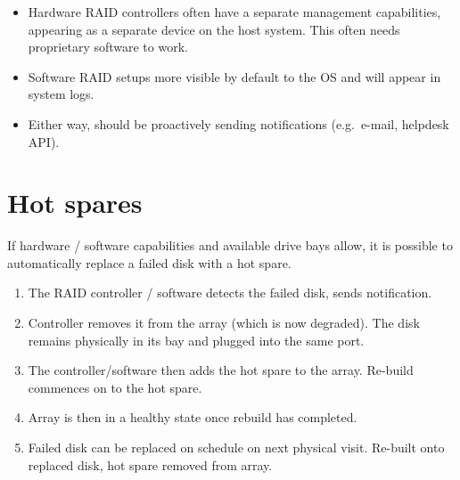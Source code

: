 \begin{itemize}
\item
  Hardware RAID controllers often have a separate management
  capabilities, appearing as a separate device on the host system. This
  often needs proprietary software to work.
\item
  Software RAID setups more visible by default to the OS and will appear
  in system logs.
\item
  Either way, should be proactively sending notifications (e.g.~e-mail,
  helpdesk API).
\end{itemize}

\section{Hot spares}\label{hot-spares}

If hardware / software capabilities and available drive bays allow, it
is possible to automatically replace a failed disk with a hot spare.

\begin{enumerate}
\def\labelenumi{\arabic{enumi}.}
\item
  The RAID controller / software detects the failed disk, sends
  notification.
\item
  Controller removes it from the array (which is now degraded). The disk
  remains physically in its bay and plugged into the same port.
\item
  The controller/software then adds the hot spare to the array. Re-build
  commences on to the hot spare.
\item
  Array is then in a healthy state once rebuild has completed.
\item
  Failed disk can be replaced on schedule on next physical visit.
  Re-built onto replaced disk, hot spare removed from array.
\end{enumerate}
